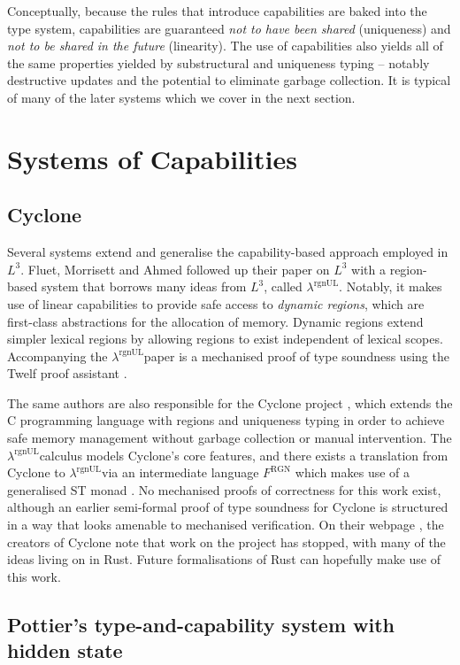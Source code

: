 \documentclass[]{unswthesis}
\newcommand{\rgnUL}{$\lambda^\text{rgnUL}$\text{ }}
\begin{document}
Conceptually, because the rules that introduce capabilities are baked into the type system, capabilities are guaranteed \textit{not to have been shared} (uniqueness) and \textit{not to be shared in the future} (linearity). The use of capabilities also yields all of the same properties yielded by substructural and uniqueness typing -- notably destructive updates and the potential to eliminate garbage collection. It is typical of many of the later systems which we cover in the next section.

\section{Systems of Capabilities}

\subsection{Cyclone}

Several systems extend and generalise the capability-based approach employed in $L^3$. Fluet, Morrisett and Ahmed followed up their paper on $L^3$ with a region-based system that borrows many ideas from $L^3$, called \rgnUL \cite{fluet06}. Notably, it makes use of linear capabilities to provide safe access to \textit{dynamic regions}, which are first-class abstractions for the allocation of memory. Dynamic regions extend simpler lexical regions by allowing regions to exist independent of lexical scopes. Accompanying the \rgnUL paper is a mechanised proof of type soundness using the Twelf proof assistant \cite{pfenning99}. 

The same authors are also responsible for the Cyclone project \cite{grossman05}, which extends the C programming language with regions and uniqueness typing in order to achieve safe memory management without garbage collection or manual intervention. The \rgnUL calculus models Cyclone's core features, and there exists a translation from Cyclone to \rgnUL via an intermediate language $F^\text{RGN}$ which makes use of a generalised ST monad \cite{fluet06, fluet04}. No mechanised proofs of correctness for this work exist, although an earlier semi-formal proof of type soundness for Cyclone \cite{jim01} is structured in a way that looks amenable to mechanised verification. On their webpage \cite{cycloneWeb}, the creators of Cyclone note that work on the project has stopped, with many of the ideas living on in Rust. Future formalisations of Rust can hopefully make use of this work.

\subsection{Pottier's type-and-capability system with hidden state}
\end{document}
